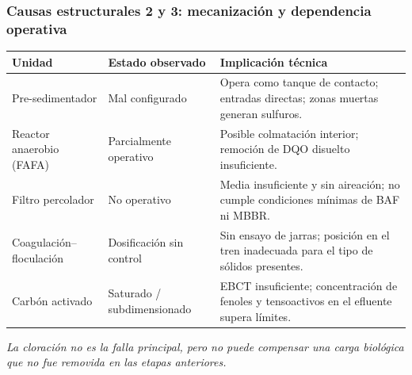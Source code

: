 \documentclass[aspectratio=169]{beamer}
\begin{document}
\begin{frame}
\frametitle{Causas estructurales 2 y 3: mecanizaci\'{o}n y dependencia operativa}
\footnotesize
\renewcommand{\arraystretch}{1.1}
\begin{tabular}{p{3.2cm}p{4.2cm}p{5.8cm}}
\toprule
\textbf{Unidad} & \textbf{Estado observado} & \textbf{Implicaci\'{o}n t\'{e}cnica} \\
\midrule
Pre-sedimentador & Mal configurado & Opera como tanque de contacto; entradas directas; zonas muertas generan sulfuros. \\
Reactor anaerobio (FAFA) & Parcialmente operativo & Posible colmataci\'{o}n interior; remoci\'{o}n de DQO disuelto insuficiente. \\
\rowcolor{rojomalo!15}
Filtro percolador & No operativo & Media insuficiente y sin aireaci\'{o}n; no cumple condiciones m\'{i}nimas de BAF ni MBBR. \\
\rowcolor{rojomalo!15}
Coagulaci\'{o}n--floculaci\'{o}n & Dosificaci\'{o}n sin control & Sin ensayo de jarras; posici\'{o}n en el tren inadecuada para el tipo de s\'{o}lidos presentes. \\
\rowcolor{rojomalo!15}
Carb\'{o}n activado & Saturado / subdimensionado & EBCT insuficiente; concentraci\'{o}n de fenoles y tensoactivos en el efluente supera l\'{i}mites. \\
\bottomrule
\end{tabular}

\vspace{4pt}
\scriptsize
\textit{La cloraci\'{o}n no es la falla principal, pero no puede compensar una carga biol\'{o}gica que no fue removida en las etapas anteriores.}
\end{frame}
\end{document}
